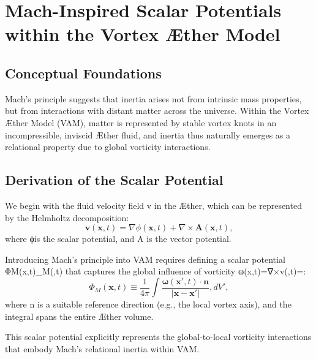 

\section{Mach-Inspired Scalar Potentials within the Vortex Æther Model}


\subsection{Conceptual Foundations}
Mach's principle suggests that inertia arises not from intrinsic mass properties, but from interactions with distant matter across the universe. Within the Vortex Æther Model (VAM), matter is represented by stable vortex knots in an incompressible, inviscid Æther fluid, and inertia thus naturally emerges as a relational property due to global vorticity interactions.


\subsection{Derivation of the Scalar Potential}
We begin with the fluid velocity field v in the Æther, which can be represented by the Helmholtz decomposition:
\begin{equation}
    \mathbf{v}(\mathbf{x}, t) = \nabla \phi(\mathbf{x}, t) + \nabla \times \mathbf{A}(\mathbf{x}, t),
\end{equation}
where ϕ\phi is the scalar potential, and A is the vector potential.


Introducing Mach's principle into VAM requires defining a scalar potential ΦM(x,t)\Phi_M(,t) that captures the global influence of vorticity ω(x,t)=∇×v\boldsymbol{\omega}(,t)=\nabla \times {}:
\begin{equation}
    \Phi_M(\mathbf{x}, t) \equiv \frac{1}{4\pi} \int \frac{\boldsymbol{\omega}(\mathbf{x}',t)\cdot\mathbf{n}}{|\mathbf{x}-\mathbf{x}'|}, dV',
\end{equation}
where n is a suitable reference direction (e.g., the local vortex axis), and the integral spans the entire Æther volume.


This scalar potential explicitly represents the global-to-local vorticity interactions that embody Mach's relational inertia within VAM.


